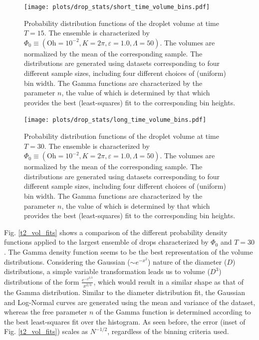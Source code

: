 
\begin{figure}
\centering
\texttt{[image: plots/drop\_stats/short\_time\_volume\_bins.pdf]}
\caption{Probability distribution functions of the droplet volume at time $T = 15$. 
	The ensemble is characterized by $\Phi_0 \equiv \left( \textrm{Oh} = 10^{-2}, K = 2\pi , \varepsilon = 1.0 , \Lambda = 50 \right)$. 
The volumes are normalized by the mean of the corresponding sample.  
The distributions are generated using datasets corresponding to four different sample sizes, 
including four different choices of (uniform) bin width. 
The Gamma functions are characterized by the parameter $n$, the value of which is determined 
by that which provides the best (least-squares) fit to the corresponding bin heights.  
	}
\label{t1_vol_bins}
\end{figure}


\begin{figure}
\centering
\texttt{[image: plots/drop\_stats/long\_time\_volume\_bins.pdf]}
\caption{Probability distribution functions of the droplet volume at time $T = 30$. 
	The ensemble is characterized by $\Phi_0 \equiv \left( \textrm{Oh} = 10^{-2}, K = 2\pi , \varepsilon = 1.0 , \Lambda = 50 \right)$. 
The volumes are normalized by the mean of the corresponding sample.  
The distributions are generated using datasets corresponding to four different sample sizes, 
including four different choices of (uniform) bin width. 
The Gamma functions are characterized by the parameter $n$, the value of which is determined 
by that which provides the best (least-squares) fit to the corresponding bin heights.  
	}
\label{t2_vol_bins}
\end{figure}

Fig. \ref{t2_vol_fits} shows a comparison of the different probability 
density functions applied to the largest ensemble of drops characterized by $\Phi_0$ and $T=30$. 
The Gamma density function seems to be the best representation of the volume distributions.
Considering the Gaussian ($\sim e^{-x^2}$) nature of the diameter ($D$) distributions, a simple variable 
transformation leads us to volume ($D^3$) distributions of the form $\frac{e^{-x^{2/3}}}{x^{2/3}}$, 
which would result in a similar shape as that of the Gamma distribution. 
Similar to the diameter distribution fit, the Gaussian and Log-Normal curves are 
generated using the mean and variance of the dataset, 
whereas the free parameter $n$ of the Gamma function is determined
according to the best least-squares fit over the histogram. 
As seen before, the error (inset of Fig. \ref{t2_vol_fits}) 
scales as $N^{-1/2}$, regardless of the binning criteria used. 

